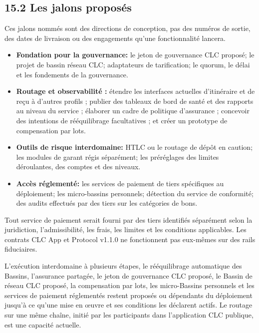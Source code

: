 \documentclass[11pt]{article}
\begin{document}
\subsection*{15.2 Les jalons proposés}

Ces jalons nommés sont des directions de conception, pas des numéros de sortie, des dates de livraison ou des engagements qu'une fonctionnalité lancera.

\begin{itemize}[leftmargin=*]
\item \textbf{Fondation pour la gouvernance:} le jeton de gouvernance CLC proposé; le projet de bassin réseau CLC; adaptateurs de tarification; le quorum, le délai et les fondements de la gouvernance.
\item \textbf{Routage et observabilité :} étendre les interfaces actuelles d'itinéraire et de reçu à d'autres profils ; publier des tableaux de bord de santé et des rapports au niveau du service ; élaborer un cadre de politique d'assurance ; concevoir des intentions de rééquilibrage facultatives ; et créer un prototype de compensation par lots.
\item \textbf{Outils de risque interdomaine:} HTLC ou le routage de dépôt en caution; les modules de garant régis séparément; les préréglages des limites déroulantes, des comptes et des niveaux.
\item \textbf{Accès réglementé:} les services de paiement de tiers spécifiques au déploiement; les micro-bassins personnels; détection du service de conformité; des audits effectués par des tiers sur les catégories de bons.
\end{itemize}
Tout service de paiement serait fourni par des tiers identifiés séparément selon la juridiction, l'admissibilité, les frais, les limites et les conditions applicables. Les contrats CLC App et Protocol v1.1.0 ne fonctionnent pas eux-mêmes sur des rails fiduciaires.

L'exécution interdomaine à plusieurs étapes, le rééquilibrage automatique des Bassins, l'assurance partagée, le jeton de gouvernance CLC proposé, le Bassin de réseau CLC proposé, la compensation par lots, les micro-Bassins personnels et les services de paiement réglementés restent proposés ou dépendants du déploiement jusqu'à ce qu'une mise en œuvre et ses conditions les déclarent actifs. Le routage sur une même chaîne, initié par les participants dans l'application CLC publique, est une capacité actuelle.
\end{document}
